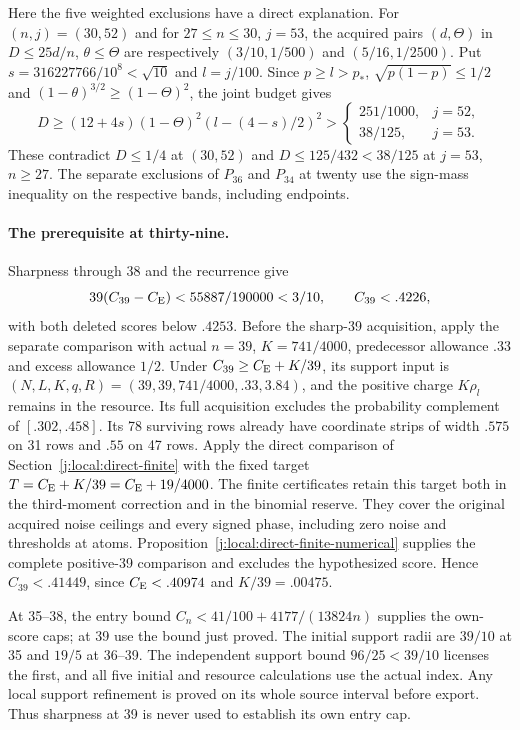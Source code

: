 Here the five weighted exclusions have a direct explanation.
For $(n,j)=(30,52)$ and for $27\le n\le30$, $j=53$, the acquired
pairs $(d,\Theta)$ in $D\le25d/n$, $\theta\le\Theta$ are respectively
$(3/10,1/500)$ and $(5/16,1/2500)$. Put
$s=316227766/10^8<\sqrt{10}$ and $l=j/100$. Since
$p\ge l>p_*$, $\sqrt{p(1-p)}\le1/2$ and
$(1-\theta)^{3/2}\ge(1-\Theta)^2$, the joint budget gives
\[
 D\ge(12+4s)(1-\Theta)^2(l-(4-s)/2)^2
 >\begin{cases}251/1000,&j=52,\\38/125,&j=53.\end{cases}
\]
These contradict $D\le1/4$ at $(30,52)$ and
$D\le125/432<38/125$ at $j=53$, $n\ge27$.
The separate exclusions of $P_{36}$ and $P_{34}$ at twenty use
the sign-mass inequality on the respective bands, including endpoints.

\paragraph{The prerequisite at thirty-nine.}
Sharpness through 38 and the recurrence give
\[
 39(C_{39}-C_{\mathrm E})<55887/190000<3/10,\qquad C_{39}<.4226,
\]
with both deleted scores below $.4253$. Before the sharp-39 acquisition,
apply the separate comparison with actual $n=39$, $K=741/4000$,
predecessor allowance $.33$ and excess allowance $1/2$.
Under $C_{39}\ge C_{\mathrm E}+K/39$, its support input is
$(N,L,K,q,R)=(39,39,741/4000,.33,3.84)$, and the positive charge
$K\rho_l$ remains in the resource. Its full acquisition excludes the
probability complement of $[.302,.458]$.
Its 78 surviving rows already have coordinate strips of width $.575$
on 31 rows and $.55$ on 47 rows. Apply the direct comparison of
Section~\ref{j:local:direct-finite} with the fixed target
$T=C_{\mathrm E}+K/39=C_{\mathrm E}+19/4000$. The finite certificates retain this target
both in the third-moment correction and in the binomial reserve.
They cover the original acquired noise ceilings and every signed phase,
including zero noise and thresholds at atoms.
Proposition~\ref{j:local:direct-finite-numerical} supplies the complete
positive-39 comparison and excludes the hypothesized score. Hence $C_{39}<.41449$, since
$C_{\mathrm E}<.40974$ and $K/39=.00475$.

At 35--38, the entry bound
$C_n<41/100+4177/(13824n)$ supplies the own-score caps; at 39 use
the bound just proved. The initial support radii are $39/10$ at 35
and $19/5$ at 36--39. The independent support bound $96/25<39/10$
licenses the first, and all five initial and resource calculations
use the actual index. Any local support refinement is proved on its
whole source interval before export. Thus sharpness at 39 is never
used to establish its own entry cap.

